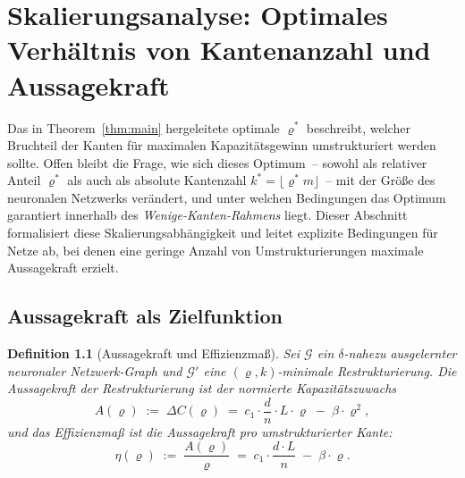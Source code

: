 ﻿\documentclass[12pt, a4paper, openany]{report}
\newtheorem{definition}[theorem]{Definition}
\newcommand{\calG}{\mathcal{G}}
\begin{document}
\chapter{Skalierungsanalyse: Optimales Verhältnis von Kantenanzahl und Aussagekraft}
\label{sec:scaling}

Das in Theorem~\ref{thm:main} hergeleitete optimale $\varrho^*$ beschreibt,
welcher Bruchteil der Kanten für maximalen Kapazitätsgewinn umstrukturiert
werden sollte.  Offen bleibt die Frage, wie sich dieses Optimum~-- sowohl
als relativer Anteil $\varrho^*$ als auch als absolute Kantenzahl
$k^* = \lfloor\varrho^* m\rfloor$~-- mit der Größe des neuronalen Netzwerks
verändert, und unter welchen Bedingungen das Optimum garantiert innerhalb des
\emph{Wenige-Kanten-Rahmens} liegt.  Dieser Abschnitt formalisiert diese
Skalierungsabhängigkeit und leitet explizite Bedingungen für Netze ab, bei
denen eine geringe Anzahl von Umstrukturierungen maximale Aussagekraft erzielt.

\section{Aussagekraft als Zielfunktion}
\label{sec:scaling_obj}

\begin{definition}[Aussagekraft und Effizienzmaß]
\label{def:aussagekraft}
Sei $\calG$ ein $\delta$-nahezu ausgelernter neuronaler Netzwerk-Graph und
$\calG'$ eine $(\varrho, k)$-minimale Restrukturierung.  Die
\emph{Aussagekraft} der Restrukturierung ist der normierte Kapazitätszuwachs
\[
  A(\varrho) \;:=\; \Delta C(\varrho)
  \;=\; c_1 \cdot \frac{d}{n} \cdot L \cdot \varrho \;-\; \beta \cdot \varrho^2,
\]
und das \emph{Effizienzmaß} ist die Aussagekraft pro umstrukturierter Kante:
\begin{equation}
  \label{eq:efficiency}
  \eta(\varrho)
  \;:=\; \frac{A(\varrho)}{\varrho}
  \;=\; c_1 \cdot \frac{d \cdot L}{n} \;-\; \beta \cdot \varrho.
\end{equation}
\end{definition}
\end{document}
